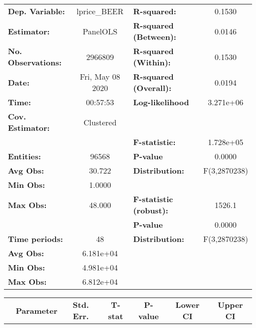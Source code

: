 \documentclass{report}
\begin{document}
\begin{center}
\begin{tabular}{lclc}
\toprule
\textbf{Dep. Variable:}    &    lprice\_BEER    & \textbf{  R-squared:         }   &      0.1530      \\
\textbf{Estimator:}        &      PanelOLS      & \textbf{  R-squared (Between):}  &      0.0146      \\
\textbf{No. Observations:} &      2966809       & \textbf{  R-squared (Within):}   &      0.1530      \\
\textbf{Date:}             &  Fri, May 08 2020  & \textbf{  R-squared (Overall):}  &      0.0194      \\
\textbf{Time:}             &      00:57:53      & \textbf{  Log-likelihood     }   &    3.271e+06     \\
\textbf{Cov. Estimator:}   &     Clustered      & \textbf{                     }   &                  \\
\textbf{}                  &                    & \textbf{  F-statistic:       }   &    1.728e+05     \\
\textbf{Entities:}         &       96568        & \textbf{  P-value            }   &      0.0000      \\
\textbf{Avg Obs:}          &       30.722       & \textbf{  Distribution:      }   &   F(3,2870238)   \\
\textbf{Min Obs:}          &       1.0000       & \textbf{                     }   &                  \\
\textbf{Max Obs:}          &       48.000       & \textbf{  F-statistic (robust):} &      1526.1      \\
\textbf{}                  &                    & \textbf{  P-value            }   &      0.0000      \\
\textbf{Time periods:}     &         48         & \textbf{  Distribution:      }   &   F(3,2870238)   \\
\textbf{Avg Obs:}          &     6.181e+04      & \textbf{                     }   &                  \\
\textbf{Min Obs:}          &     4.981e+04      & \textbf{                     }   &                  \\
\textbf{Max Obs:}          &     6.812e+04      & \textbf{                     }   &                  \\
\bottomrule
\end{tabular}
\begin{tabular}{lcccccc}
                           & \textbf{Parameter} & \textbf{Std. Err.} & \textbf{T-stat} & \textbf{P-value} & \textbf{Lower CI} & \textbf{Upper CI}  \\

\end{tabular}
\end{center}
\end{document}
